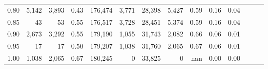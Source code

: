 \begin{tabular}{rrrrrrrrrrrrrr}
0.80 &   5,142 &  3,893 &  0.43 &  176,474 &    3,771 &  28,398 &   5,427 &  0.59 &  0.16 &      0.04 \\
0.85 &      43 &     53 &  0.55 &  176,517 &    3,728 &  28,451 &   5,374 &  0.59 &  0.16 &      0.04 \\
0.90 &   2,673 &  3,292 &  0.55 &  179,190 &    1,055 &  31,743 &   2,082 &  0.66 &  0.06 &      0.01 \\
0.95 &      17 &     17 &  0.50 &  179,207 &    1,038 &  31,760 &   2,065 &  0.67 &  0.06 &      0.01 \\
1.00 &   1,038 &  2,065 &  0.67 &  180,245 &        0 &  33,825 &       0 &   nan &  0.00 &      0.00 \\
\bottomrule
\end{tabular}
